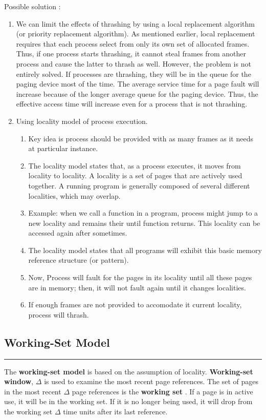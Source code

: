 \documentclass[12pt,onecolumn]{IEEEtran}
\begin{document}
Possible solution :
\begin{enumerate}
	\item We can limit the effects of thrashing by using a local replacement algorithm (or priority replacement algorithm). As mentioned earlier, local replacement requires that each process select from only its own set of allocated frames.
	Thus, if one process starts thrashing, it cannot steal frames from another process and cause the latter to thrash as well. However, the problem is not entirely
	solved. If processes are thrashing, they will be in the queue for the paging
	device most of the time. The average service time for a page fault will increase because of the longer average queue for the paging device. Thus, the effective
	access time will increase even for a process that is not thrashing.
	\item Using locality model of process execution.
	\begin{enumerate}
		\item Key idea is process should be provided with as many  frames as it needs at particular instance.
		\item The locality model states that, as a process executes, it moves from locality
		to locality. A locality is a set of pages that are actively used together. A running
		program is generally composed of several different localities, which may overlap.
		\item Example: when we call a function in a program, process might jump to a new locality and remains their until function returns. This locality can be accessed again after sometimes.
		\item The locality model states that all programs will exhibit this basic memory reference structure (or pattern).
		\item Now, Process will fault for the pages in its locality until all these pages are in memory; then, it will not fault again until it changes localities.
		\item If enough frames are not provided to accomodate it current locality, process will thrash.
	\end{enumerate}
\end{enumerate}

\subsection{Working-Set Model}
\hrule
\vspace{3mm}

The \textbf{working-set model} is based on the assumption of locality. \textbf{Working-set window}, $\Delta$ is used to examine
the most recent page references. The set of pages in the most recent $\Delta$ page references is the \textbf{working set} . If a page is in active use, it will be in
the working set. If it is no longer being used, it will drop from the working set
$\Delta$ time units after its last reference.
\end{document}
